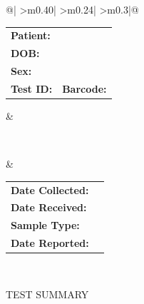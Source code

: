 \documentclass[10pt, letterpaper]{article}
\begin{document}
\begin{tabularx}{\textwidth}{@{}|%
    >{\RaggedRight\arraybackslash}m{0.40\textwidth}|%
    >{\centering\arraybackslash}m{0.24\textwidth}|%
    >{\RaggedRight\arraybackslash}m{0.3\textwidth}|@{}}
\begin{minipage}[t]{\linewidth}
  \vspace{0.5pt}
  \BodyFont
  \begin{tabular}{@{}l l@{}}
    \textbf{Patient:} & \Val{PatientFirstName} \Val{PatientLastName} \\[4pt]
    \textbf{DOB:}     & \Val{PatientDOB} \\[4pt]
    \textbf{Sex:}     & \Val{PatientSex} \\[6pt]
    \textbf{Test ID:} & \Val{TestID} \quad \textbf{Barcode:} \Val{Barcode}
  \end{tabular}
  \vspace{2pt}
\end{minipage}
&
\begin{minipage}[t]{\linewidth}
  \vspace{3pt}
  \BodyFont
  \centering
  \\[8pt]
  \vspace{2pt}
\end{minipage}
&
\begin{minipage}[t]{\linewidth}
  \vspace{0.5pt}
  \BodyFont
  \begin{tabular}{@{}l l@{}}
    \textbf{Date Collected:} & \Val{DateCollected} \\[4pt]
    \textbf{Date Received:}  & \Val{DateReceived} \\[4pt]
    \textbf{Sample Type:}    & \Val{SampleType} \\[4pt]
    \textbf{Date Reported:}    & \Val{ReportDate}
  \end{tabular}
  \vspace{2pt}
\end{minipage}
\\ \hline
\end{tabularx}


\vspace{13pt}



\noindent %
\fontsize{14}{16}\selectfont \textcolor{tabletitlegray}{TEST SUMMARY}
\end{document}
